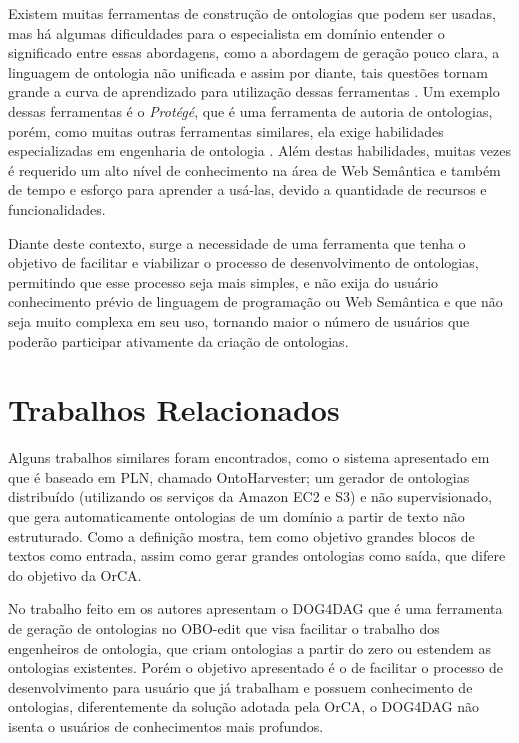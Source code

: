 \documentclass{bcc}
\begin{document}
Existem muitas ferramentas de construção de ontologias que podem ser usadas, mas há algumas dificuldades para o especialista em domínio entender o significado entre essas abordagens, como a abordagem de geração pouco clara, a linguagem de ontologia não unificada e assim por diante, tais questões tornam grande a curva de aprendizado para utilização dessas ferramentas \cite{zhou2010}. Um exemplo dessas ferramentas é o \textit{Protégé}, que é uma ferramenta de autoria de ontologias, porém, como muitas outras ferramentas similares, ela exige habilidades especializadas em engenharia de ontologia \cite{funk2007}. Além destas habilidades, muitas vezes é requerido um alto nível de conhecimento na área de Web Semântica e também de tempo e esforço para aprender a usá-las, devido a quantidade de recursos e funcionalidades.

Diante deste contexto, surge a necessidade de uma ferramenta que tenha o objetivo de facilitar e viabilizar o processo de desenvolvimento de ontologias, permitindo que esse processo seja mais simples, e não exija do usuário conhecimento prévio de linguagem de programação ou Web Semântica e que não seja muito complexa em seu uso, tornando maior o número de usuários que poderão participar ativamente da criação de ontologias.

\section{Trabalhos Relacionados}

Alguns trabalhos similares foram encontrados, como o sistema apresentado em \cite{mousavi2013} que é baseado em PLN, chamado OntoHarvester; um gerador de ontologias distribuído (utilizando os serviços da Amazon EC2 e S3) e não supervisionado, que gera automaticamente ontologias de um domínio a partir de texto não estruturado. Como a definição mostra, tem como objetivo grandes blocos de textos como entrada, assim como gerar grandes ontologias como saída, que difere do objetivo da OrCA. 

No trabalho feito em \cite{wachter2011} os autores apresentam o DOG4DAG que é uma ferramenta de geração de ontologias no OBO-edit \cite{day2007} que visa facilitar o trabalho dos engenheiros de ontologia, que criam ontologias a partir do zero ou estendem as ontologias existentes. Porém o objetivo apresentado é o de facilitar o processo de desenvolvimento para usuário que já trabalham e possuem conhecimento de ontologias, diferentemente da solução adotada pela OrCA, o DOG4DAG não isenta o usuários de conhecimentos mais profundos.
\end{document}
